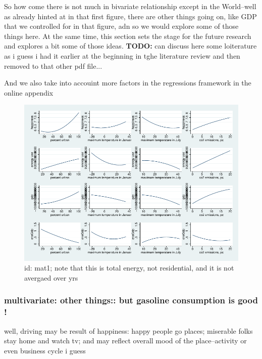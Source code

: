 \documentclass[10pt, letterpaper]{article}
\begin{document}
\begin{spacing}{1.4}
So how come there is not much in bivariate relationship except in the
World--well as already hinted at in that first figure, there are other things
going on, like GDP that we controlled for in that figure, adn so we would
explore some of those things here. At the same time, this section sets the stage
for the future research and explores a bit some of those ideas.
\textbf{TODO:} can discuss here some loiterature as i guess i had it earlier at
the beginning in tghe literature review and then removed to that other pdf file...


And we also take into accouint more factors in the regressions framework in the
online appendix

\begin{figure}[H]
 \includegraphics[width=6in]{graphsAndTables/mat1.pdf}\centering
\caption{id: mat1;  note that this is total energy, not residential, and it is not avergaed
over yrs}\label{mat1}
 \end{figure}


\subsubsection{multivariate: other things:: but gasoline consumption is good !}

well, driving may be result of happiness: happy people go places; miserable
folks stay home and watch tv; and may reflect overall mood of the
place--activity or even business cycle i guess


\end{spacing}
\end{document}
